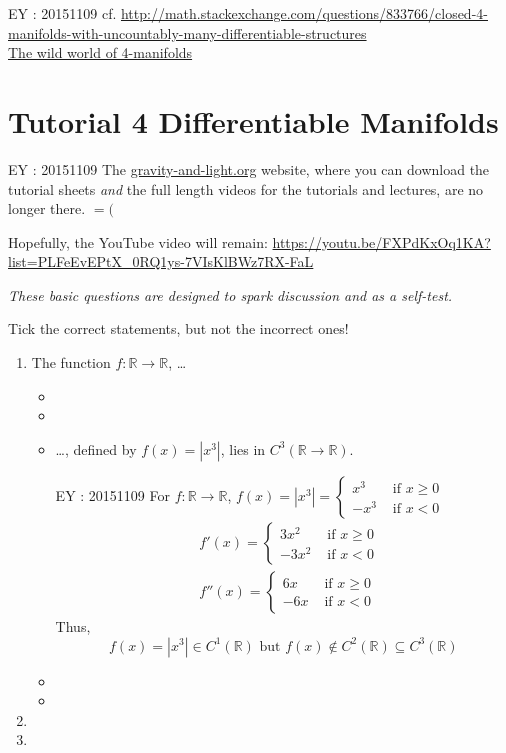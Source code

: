 	EY : 20151109 cf. \url{http://math.stackexchange.com/questions/833766/closed-4-manifolds-with-uncountably-many-differentiable-structures}  \\
	\href{http://www.maths.ed.ac.uk/~aar/papers/scorpan.pdf}{The wild world of 4-manifolds}
	
	
	\section*{Tutorial 4 Differentiable Manifolds}
	
	EY : 20151109 The \url{gravity-and-light.org} website, where you can download the tutorial sheets \emph{and} the full length videos for the tutorials and lectures, are no longer there.  $=($  
	
	Hopefully, the YouTube video will remain: \url{https://youtu.be/FXPdKxOq1KA?list=PLFeEvEPtX_0RQ1ys-7VIsKlBWz7RX-FaL}
	
	 \emph{These basic questions are designed to spark discussion and as a self-test.}
	
	Tick the correct statements, but not the incorrect ones!
	
	\begin{enumerate}
	\item[(a)] The function $f: \mathbb{R} \to \mathbb{R}$, \dots
	\begin{itemize}
	\item  
	\item
	\item \dots , defined by $f(x) = |x^3|$, lies in $C^3(\mathbb{R} \to \mathbb{R})$.  
	
	EY : 20151109  For $f: \mathbb{R} \to \mathbb{R}$, $f(x) = |x^3| = \begin{cases} x^3 & \text{ if } x \geq 0 \\
	-x^3 & \text{ if } x < 0 \end{cases}$ 
	\[
	\begin{aligned}
	& f'(x) = \begin{cases} 3x^2  & \text{ if } x \geq 0 \\
	-3x^2 & \text{ if } x < 0 \end{cases} \\ 
	& f''(x) = \begin{cases} 6x  & \text{ if } x \geq 0 \\
	-6x & \text{ if } x < 0 \end{cases} 
	\end{aligned}
	\]
	Thus, 
	\[
	\boxed{ f(x) = |x^3| \in C^1(\mathbb{R}) \text{ but } f(x) \notin C^2(\mathbb{R}) \subseteq C^3(\mathbb{R}) }
	\]
	\item
	\item
	\end{itemize}
	\item[(b)]
	\item[(c)]
	\end{enumerate}
	
